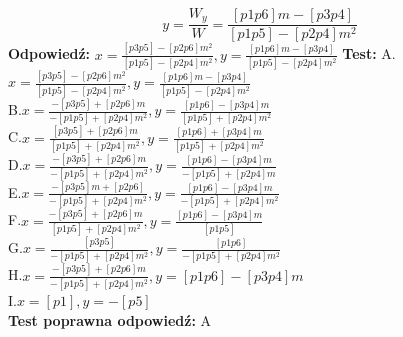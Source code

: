 \documentclass[12pt, a4paper]{article}
\theoremstyle{definition} %
\newcommand{\rozwStop}{\newline}                                            %
\newcommand{\odpStart}{\noindent \textbf{Odpowiedź:}\newline}    %
\newcommand{\odpStop}{\newline}                                             %
\newcommand{\testStart}{\noindent \textbf{Test:}\newline} %
\newcommand{\testStop}{\newline} %
\newcommand{\kluczStart}{\noindent \textbf{Test poprawna odpowiedź:}\newline} %
\newcommand{\kluczStop}{\newline} %
\begin{document}
$$y=\frac{W_{y}}{W}=\frac{[p1p6]m-[p3p4]}{[p1p5]-[p2p4]m^{2}}$$
\rozwStop
\odpStart
$x=\frac{[p3p5]-[p2p6]m^{2}}{[p1p5]-[p2p4]m^{2}}, y=\frac{[p1p6]m-[p3p4]}{[p1p5]-[p2p4]m^{2}}$
\odpStop
\testStart
A.$x=\frac{[p3p5]-[p2p6]m^{2}}{[p1p5]-[p2p4]m^{2}}, y=\frac{[p1p6]m-[p3p4]}{[p1p5]-[p2p4]m^{2}}$\\
B.$x=\frac{-[p3p5]+[p2p6]m}{-[p1p5]+[p2p4]m^{2}}, y=\frac{[p1p6]-[p3p4]m}{[p1p5]+[p2p4]m^{2}}$\\
C.$x=\frac{[p3p5]+[p2p6]m}{[p1p5]+[p2p4]m^{2}}, y=\frac{[p1p6]+[p3p4]m}{[p1p5]+[p2p4]m^{2}}$\\
D.$x=\frac{-[p3p5]+[p2p6]m}{-[p1p5]+[p2p4]m^{2}}, y=\frac{[p1p6]-[p3p4]m}{-[p1p5]+[p2p4]m}$\\
E.$x=\frac{-[p3p5]m+[p2p6]}{-[p1p5]+[p2p4]m^{2}}, y=\frac{[p1p6]-[p3p4]m}{-[p1p5]+[p2p4]m^{2}}$\\
F.$x=\frac{-[p3p5]+[p2p6]m}{[p1p5]+[p2p4]m^{2}}, y=\frac{[p1p6]-[p3p4]m}{[p1p5]}$\\
G.$x=\frac{[p3p5]}{-[p1p5]+[p2p4]m^{2}}, y=\frac{[p1p6]}{-[p1p5]+[p2p4]m^{2}}$\\
H.$x=\frac{-[p3p5]+[p2p6]m}{-[p1p5]+[p2p4]m^{2}}, y=[p1p6]-[p3p4]m$\\
I.$x=[p1], y=-[p5]$\\
\testStop
\kluczStart
A
\kluczStop
\end{document}
